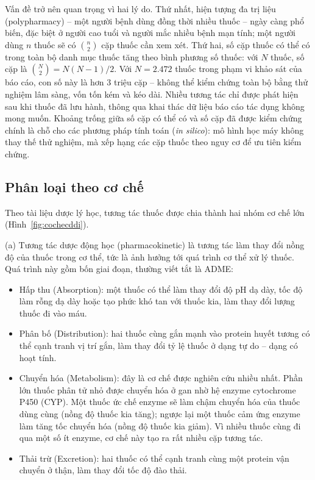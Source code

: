\documentclass[12pt,a4paper,oneside]{report}
\begin{document}
Vấn đề trở nên quan trọng vì hai lý do. Thứ nhất, hiện tượng đa trị liệu
(polypharmacy) -- một người bệnh dùng đồng thời nhiều thuốc -- ngày càng phổ
biến, đặc biệt ở người cao tuổi và người mắc nhiều bệnh mạn tính; một người
dùng $n$ thuốc sẽ có $\binom{n}{2}$ cặp thuốc cần xem xét. Thứ hai, số cặp
thuốc có thể có trong toàn bộ danh mục thuốc tăng theo bình phương số thuốc:
với $N$ thuốc, số cặp là $\binom{N}{2} = N(N-1)/2$. Với $N = 2.472$ thuốc trong
phạm vi khảo sát của báo cáo, con số này là hơn 3 triệu cặp -- không thể kiểm chứng toàn
bộ bằng thử nghiệm lâm sàng, vốn tốn kém và kéo dài. Nhiều tương tác chỉ được phát hiện sau khi thuốc đã lưu hành, thông qua khai
thác dữ liệu báo cáo tác dụng không mong muốn.
Khoảng trống giữa số cặp có thể có và số cặp đã được kiểm chứng chính là chỗ cho
các phương pháp tính toán (\textit{in silico}): mô hình học máy không thay thế
thử nghiệm, mà xếp hạng các cặp thuốc theo nguy cơ để ưu tiên kiểm chứng.

\subsection{Phân loại theo cơ chế}
Theo tài liệu dược lý học, tương tác thuốc được chia thành hai nhóm cơ chế lớn
(Hình~\ref{fig:cochecddi}).

(a) Tương tác dược động học (pharmacokinetic) là tương tác làm thay đổi
nồng độ của thuốc trong cơ thể, tức là ảnh hưởng tới quá trình cơ thể xử
lý thuốc. Quá trình này gồm bốn giai đoạn, thường viết tắt là ADME:
\begin{itemize}
  \item Hấp thu (Absorption): một thuốc có thể làm thay đổi độ pH dạ
        dày, tốc độ làm rỗng dạ dày hoặc tạo phức khó tan với thuốc kia, làm
        thay đổi lượng thuốc đi vào máu.
  \item Phân bố (Distribution): hai thuốc cùng gắn mạnh vào protein
        huyết tương có thể cạnh tranh vị trí gắn, làm thay đổi tỷ lệ thuốc ở
        dạng tự do -- dạng có hoạt tính.
  \item Chuyển hóa (Metabolism): đây là cơ chế được nghiên cứu nhiều
        nhất. Phần lớn thuốc phân tử nhỏ được chuyển hóa ở gan nhờ hệ enzyme
        cytochrome P450 (CYP). Một thuốc ức chế enzyme sẽ làm chậm
        chuyển hóa của thuốc dùng cùng (nồng độ thuốc kia tăng); ngược lại một
        thuốc cảm ứng enzyme làm tăng tốc chuyển hóa (nồng độ thuốc kia
        giảm). Vì nhiều thuốc cùng đi qua một số ít enzyme, cơ chế này tạo ra
        rất nhiều cặp tương tác.
  \item Thải trừ (Excretion): hai thuốc có thể cạnh tranh cùng một
        protein vận chuyển ở thận, làm thay đổi tốc độ đào thải.
\end{itemize}
\end{document}
